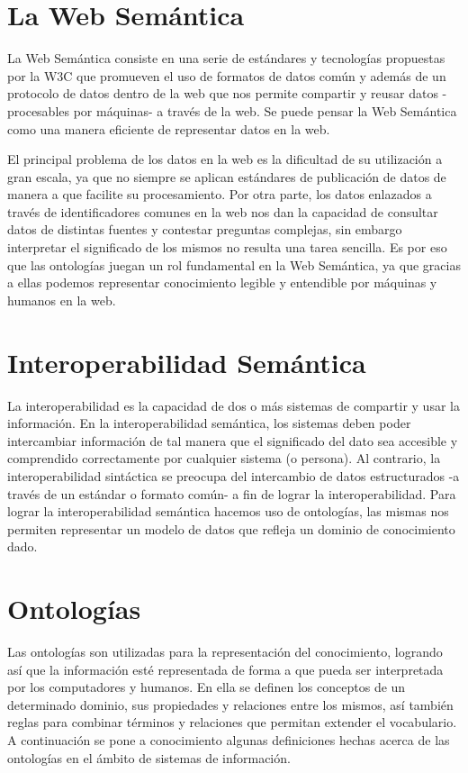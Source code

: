 \section{La Web Semántica}
La Web Semántica consiste en una serie de estándares y tecnologías propuestas por la W3C\cite{Semantic20:online} que promueven el uso de formatos de datos común y además de un protocolo de datos dentro de la web que nos permite compartir y reusar datos -procesables por máquinas- a través de la web. Se puede pensar la Web Semántica como una manera eficiente de representar datos en la web\cite{TimBernersLeee}\cite{Shadbolt:2006}.

El principal problema de los datos en la web es la dificultad de su utilización a gran escala, ya que no siempre se aplican estándares de publicación de datos de manera a que facilite su procesamiento. Por otra parte, los datos enlazados a través de identificadores comunes en la web nos dan la capacidad de consultar datos de distintas fuentes y contestar preguntas complejas, sin embargo interpretar el significado de los mismos no resulta una tarea sencilla. Es por eso que las ontologías juegan un rol fundamental en la Web Semántica, ya que gracias a ellas podemos representar conocimiento legible y entendible por máquinas y humanos en la web.

\section{Interoperabilidad Semántica}
\label{section:interoperabilidadsemantica}
La interoperabilidad es la capacidad de dos o más sistemas de compartir y usar la  información. En la interoperabilidad semántica, los sistemas deben poder intercambiar información de tal manera que el significado del dato sea accesible y comprendido correctamente por cualquier sistema (o persona)\cite{Interoperability}\cite{Schulz2013HowOC}. Al contrario, la interoperabilidad sintáctica se preocupa del intercambio de datos estructurados -a través de un estándar o formato común- a fin de lograr la interoperabilidad.
Para lograr la interoperabilidad semántica hacemos uso de ontologías, las mismas nos permiten representar un modelo de datos que refleja un dominio de conocimiento dado.

\section{Ontologías}
Las ontologías son utilizadas para la representación del conocimiento, logrando así que la información esté representada de forma a que pueda ser interpretada por los computadores y humanos\cite{horrocks2011kr}. En ella se definen los conceptos de un determinado dominio, sus propiedades y relaciones entre los mismos, así también reglas para combinar términos y relaciones que permitan extender el vocabulario.
A continuación se pone a conocimiento algunas definiciones hechas acerca de las ontologías en el ámbito de sistemas de información.

